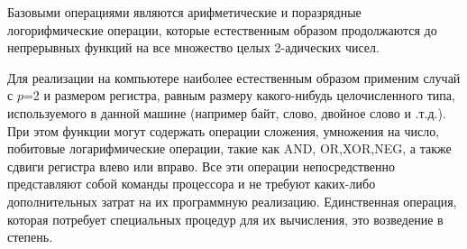 Базовыми операциями являются арифметические и поразрядные логорифмические операции, которые естественным образом продолжаются до непрерывных функций на все множество целых 2-адических чисел.

Для реализации на компьютере наиболее естественным образом применим случай с $p$=2 и размером регистра, равным размеру какого-нибудь целочисленного типа, используемого в данной машине (например байт, слово, двойное слово и .т.д.). При этом функции могут содержать операции сложения, умножения на число, побитовые логарифмические операции, такие как AND, OR,XOR,NEG, а также сдвиги регистра влево или вправо. Все эти операции непосредственно представляют собой команды процессора и не требуют каких-либо дополнительных затрат на их программную реализацию. Единственная операция, которая потребует специальных процедур для их вычисления, это возведение в степень.

\clearpage

